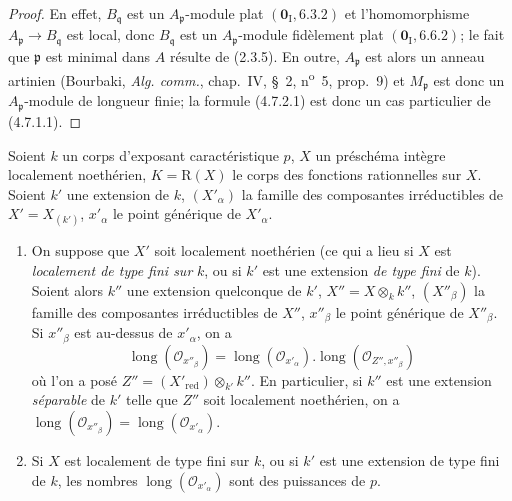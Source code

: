 \begin{proof}
En effet, $B_{\mathfrak q}$ est un $A_{\mathfrak p}$-module plat
$(\mathbf{0}_{\mathrm I},6.3.2)$ et l'homomorphisme
$A_{\mathfrak p}\to B_{\mathfrak q}$ est local, donc $B_{\mathfrak q}$ est
un $A_{\mathfrak p}$-module fidèlement plat $(\mathbf{0}_{\mathrm I},6.6.2)$; le fait
que $\mathfrak p$ est minimal dans $A$ résulte de (2.3.5). En outre,
$A_{\mathfrak p}$ est alors un anneau artinien (Bourbaki, \emph{Alg. comm.},
chap.~IV, \S~2, n\textsuperscript{o}~5, prop.~9) et $M_{\mathfrak p}$ est donc
un $A_{\mathfrak p}$-module de longueur finie; la formule (4.7.2.1) est donc
un cas particulier de (4.7.1.1).
\end{proof}

\begin{proposition}[4.7.3]
Soient $k$ un corps d'exposant caractéristique $p$, $X$ un préschéma intègre
localement noethérien, $K=\mathrm R(X)$ le corps des fonctions rationnelles
sur $X$. Soient $k'$ une extension de $k$, $(X'_\alpha)$ la famille des
composantes irréductibles de $X'=X_{(k')}$, $x'_\alpha$ le point générique de
$X'_\alpha$.
\begin{enumerate}
\item[\textup{(i)}] On suppose que $X'$ soit localement noethérien \textup{(ce qui a lieu si
$X$ est \emph{localement de type fini sur} $k$, ou si $k'$ est une extension \emph{de type
fini} de $k$)}. Soient alors $k''$ une extension quelconque de $k'$,
$X''=X\otimes_k k''$, $(X''_\beta)$ la famille des composantes irréductibles
de $X''$, $x''_\beta$ le point générique de $X''_\beta$. Si $x''_\beta$ est
au-dessus de $x'_\alpha$, on a
\begin{equation}
\operatorname{long}(\mathcal O_{x''_\beta})
=\operatorname{long}(\mathcal O_{x'_\alpha})
 .\operatorname{long}(\mathcal O_{Z'',x''_\beta})
\tag{4.7.3.1}
\label{IV.2.4.7.3.1-fr}
\end{equation}
où l'on a posé $Z''=(X'_{\mathrm{red}})\otimes_{k'}k''$. En particulier, si
$k''$ est une extension \emph{séparable} de $k'$ telle que $Z''$ soit localement
noethérien, on a
$\operatorname{long}(\mathcal O_{x''_\beta})
=\operatorname{long}(\mathcal O_{x'_\alpha})$.


\item[\textup{(ii)}] Si $X$ est localement de type fini sur $k$, ou si $k'$ est une
extension de type fini de $k$, les nombres
$\operatorname{long}(\mathcal O_{x'_\alpha})$ sont des puissances de $p$.


\end{enumerate}
\end{proposition}
